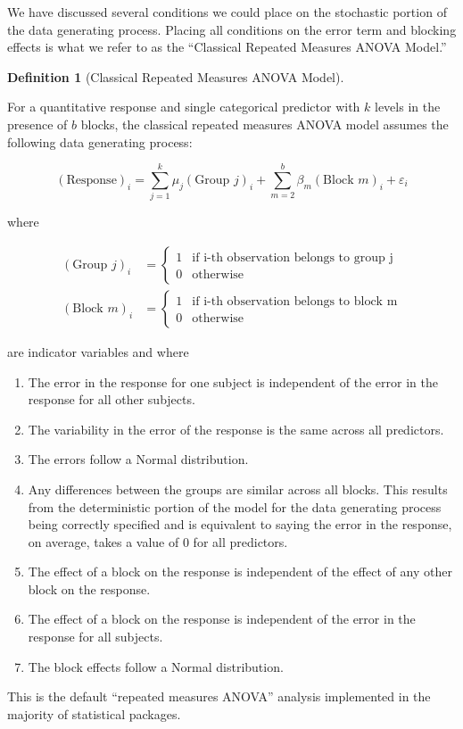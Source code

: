 \documentclass[
  letterpaper,
  DIV=11,
  numbers=noendperiod]{scrreprt}
\providecommand{\tightlist}{%
  \setlength{\itemsep}{0pt}\setlength{\parskip}{0pt}}\usepackage{longtable,booktabs,array}
\theoremstyle{definition}
\newtheorem{definition}{Definition}[chapter]
\theoremstyle{definition}
\theoremstyle{plain}
\theoremstyle{remark}
\begin{document}
We have discussed several conditions we could place on the stochastic
portion of the data generating process. Placing all conditions on the
error term and blocking effects is what we refer to as the ``Classical
Repeated Measures ANOVA Model.''

\begin{definition}[Classical Repeated Measures ANOVA
Model]\protect\hypertarget{def-classical-repeated-measures-anova}{}\label{def-classical-repeated-measures-anova}

For a quantitative response and single categorical predictor with \(k\)
levels in the presence of \(b\) blocks, the classical repeated measures
ANOVA model assumes the following data generating process:

\[(\text{Response})_i = \sum_{j=1}^{k} \mu_j (\text{Group } j)_i + \sum_{m=2}^{b} \beta_m (\text{Block } m)_i + \varepsilon_i\]

where

\[
\begin{aligned}
  (\text{Group } j)_{i} &= \begin{cases}
    1 & \text{if i-th observation belongs to group j} \\
    0 & \text{otherwise}
    \end{cases} \\
  (\text{Block } m)_{i} &= \begin{cases}
    1 & \text{if i-th observation belongs to block m} \\
    0 & \text{otherwise}
    \end{cases}
\end{aligned}
\]

are indicator variables and where

\begin{enumerate}
\def\labelenumi{\arabic{enumi}.}
\tightlist
\item
  The error in the response for one subject is independent of the error
  in the response for all other subjects.
\item
  The variability in the error of the response is the same across all
  predictors.
\item
  The errors follow a Normal distribution.
\item
  Any differences between the groups are similar across all blocks. This
  results from the deterministic portion of the model for the data
  generating process being correctly specified and is equivalent to
  saying the error in the response, on average, takes a value of 0 for
  all predictors.
\item
  The effect of a block on the response is independent of the effect of
  any other block on the response.
\item
  The effect of a block on the response is independent of the error in
  the response for all subjects.
\item
  The block effects follow a Normal distribution.
\end{enumerate}

This is the default ``repeated measures ANOVA'' analysis implemented in
the majority of statistical packages.

\end{definition}
\end{document}
